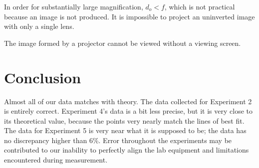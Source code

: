 \documentclass[12pt]{article}
\begin{document}
\subsubsubsection{}

In order for substantially large magnification, \(d_o < f\), which is not
practical because an image is not produced. It is impossible to project an
uninverted image with only a single lens.

\subsubsubsection{}

The image formed by a projector cannot be viewed without a viewing screen.















\section{Conclusion}

\qq Almost all of our data matches with theory. The data collected for
Experiment 2 is entirely correct. Experiment 4's data is a bit less precise, but
it is very close to its theoretical value, because the points very nearly match
the lines of best fit. The data for Experiment 5 is very near what it is
supposed to be; the data has no discrepancy higher than 6\%. Error throughout
the experiments may be contributed to our inability to perfectly align the lab
equipment and limitations encountered during measurement.

\end{document}
